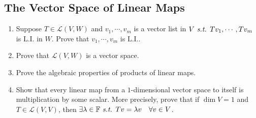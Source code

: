 \documentclass[11pt, letterpaper]{article}
\def\F{\mathbb{F}}
\def\L{\mathcal{L}}
\def\st{\emph{ s.t. }}
\def\LI{\mathrm{L.I.}}
\begin{document}
\subsection{The Vector Space of Linear Maps}
\begin{enumerate}
	\item Suppose $T\in\L(V,W)$ and $v_1,\cdots,v_m$ is a vector list in $V\st Tv_1,\cdots,Tv_m$ is $\LI$ in $W$. Prove that $v_1,\cdots,v_m$ is $\LI$.
	\item Prove that $\L(V,W)$ is a vector space.
	\item Prove the algebraic properties of products of linear maps. 
	\item Show that every linear map from a $1$-dimensional vector space to itself is multiplication by some scalar. More precisely, prove that if $\dim V=1$ and $T\in\L(V,V)$, then $\exists\lambda\in\F\st Tv=\lambda v\quad\forall v\in V$.
\end{enumerate}
\end{document}
